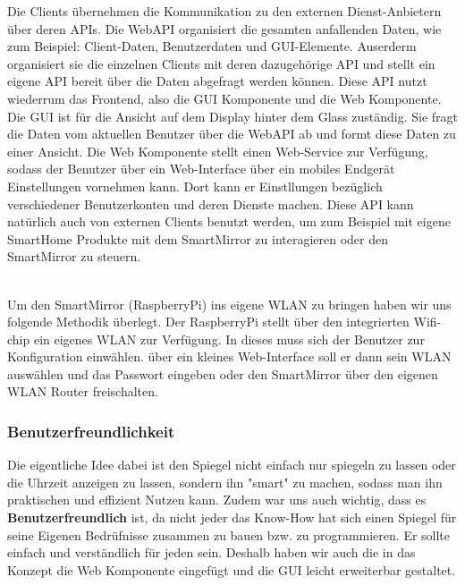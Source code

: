 Die Clients übernehmen die Kommunikation zu den externen Dienst-Anbietern über deren APIs. Die WebAPI organisiert die gesamten anfallenden Daten, wie zum Beispiel: Client-Daten, Benutzerdaten und GUI-Elemente. Auserderm organisiert sie die einzelnen Clients mit deren dazugehörige API und stellt ein eigene API bereit über die Daten abgefragt werden können. Diese API nutzt wiederrum das Frontend, also die GUI Komponente und die Web Komponente. Die GUI ist für die Ansicht auf dem Display hinter dem Glass zuständig. Sie fragt die Daten vom aktuellen Benutzer über die WebAPI ab und formt diese Daten zu einer Ansicht. Die Web Komponente stellt einen Web-Service zur Verfügung, sodass der Benutzer über ein Web-Interface über ein mobiles Endgerät Einstellungen vornehmen kann. Dort kann er Einstllungen bezüglich verschiedener Benutzerkonten und deren Dienste machen. Diese API kann natürlich auch von externen Clients benutzt werden, um zum Beispiel mit eigene SmartHome Produkte mit dem SmartMirror zu interagieren oder den SmartMirror zu steuern.\\\

Um den SmartMirror (RaspberryPi) ins eigene WLAN zu bringen haben wir uns folgende Methodik überlegt. Der RaspberryPi stellt über den integrierten Wifi-chip ein eigenes WLAN zur Verfügung. In dieses muss sich der Benutzer zur Konfiguration einwählen. über ein kleines Web-Interface soll er dann sein WLAN auswählen und das Passwort eingeben oder den SmartMirror über den eigenen WLAN Router freischalten.


\subsubsection{Benutzerfreundlichkeit}\label{Benutzerfreundlichkeit}
Die eigentliche Idee dabei ist den Spiegel nicht einfach nur spiegeln zu lassen oder die Uhrzeit anzeigen zu lassen, sondern ihn "smart" zu machen, sodass man ihn praktischen und effizient Nutzen kann. Zudem war uns auch wichtig, dass es \textbf{Benutzerfreundlich} ist, da nicht jeder das Know-How hat sich einen Spiegel für seine Eigenen Bedrüfnisse zusammen zu bauen bzw. zu programmieren. Er sollte einfach und verständlich für jeden sein. Deshalb haben wir auch die in das Konzept die Web Komponente eingefügt und die GUI leicht erweiterbar gestaltet.

